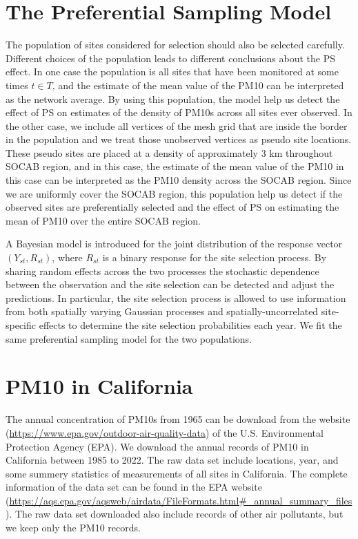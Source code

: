 \section{The Preferential Sampling Model}
The population of sites considered for selection should also be selected carefully.
Different choices of the population leads to different conclusions about the PS effect. 
In one case the population is all sites that have been monitored at some times $t \in T$, and
the estimate of the mean value of the PM10 can be interpreted as the network average.
By using this population, the model help us detect the effect of PS on estimates of the density of 
PM10s across all sites ever observed. 
In the other case, we include all vertices of the mesh grid that are inside the border in the 
population and we treat those unobserved vertices as pseudo site locations. These pseudo sites are
placed at a density of approximately 3 km throughout SOCAB region, and in this case, the estimate 
of the mean value of the PM10 in this case can be interpreted as the PM10 density across the SOCAB
region. Since we are uniformly cover the 
SOCAB region, this population help us detect if the observed sites are preferentially selected and 
the effect of PS on estimating the mean of PM10 over the entire SOCAB region.

A Bayesian model is 
introduced for the joint distribution of the response vector $(Y_{st}, R_{st})$, where $R_{st}$ is
a binary response for the site selection process. By sharing random effects across the two processes
the stochastic dependence between the observation and the site selection can be detected and adjust 
the predictions. In particular, the site selection process is allowed to use information from both
spatially varying Gaussian processes and spatially-uncorrelated site-specific effects to determine
the site selection probabilities each year.
We fit the same preferential sampling model for the two populations.


\section{PM10 in California}
The annual concentration of PM10s from 1965 can be download from the website (\url{https://www.epa.gov/outdoor-air-quality-data}) 
of the U.S. Environmental Protection Agency (EPA). We download the annual records of PM10 in California 
between 1985 to 2022. The raw data set include locations, year, and some summery statistics of 
measurements of all sites in California. The complete information of the data set can be found in
the EPA website (\url{https://aqs.epa.gov/aqsweb/airdata/FileFormats.html#_annual_summary_files}).
The raw data set downloaded also include records of other air pollutants, but we keep only the PM10
records.

